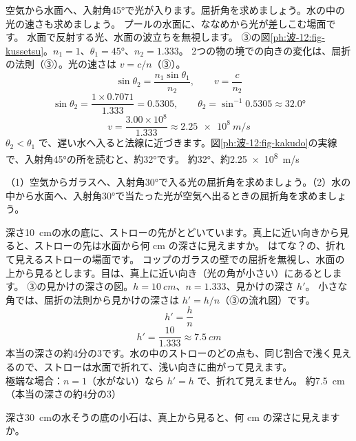 \label{ph:波-12:ex2}
\begin{phreidai}[空気から水へ入る光]
空気から水面へ、入射角\ang{45}で光が入ります。屈折角を求めましょう。水の中の光の速さも求めましょう。
\phbamen
プールの水面に、ななめから光が差しこむ場面です。
\phmushi
水面で反射する光、水面の波立ちを無視します。
\phzu
③の図\ref{ph:波-12:fig-kussetsu}。$n_1=1$、$\theta_1=\ang{45}$、$n_2=1.333$。
\phriyu
2つの物の境での向きの変化は、屈折の法則（③）。光の速さは $v=c/n$（③）。
\phtateru
\[\sin\theta_2=\frac{n_1\sin\theta_1}{n_2},\qquad v=\frac{c}{n_2}\]
\phtoku
\[\sin\theta_2=\frac{1\times0.7071}{1.333}=0.5305,\qquad\theta_2=\sin^{-1}0.5305\approx\ang{32.0}\]
\[v=\frac{3.00\times10^8}{1.333}\approx\qty{2.25e8}{m/s}\]
\phtashikame
$\theta_2<\theta_1$ で、遅い水へ入ると法線に近づきます。図\ref{ph:波-12:fig-kakudo}の実線で、入射角\ang{45}の所を読むと、約\ang{32}です。
\kotae 約\ang{32}、約\qty{2.25e8}{m/s}
\end{phreidai}
\begin{jibun}
（1）空気からガラスへ、入射角\ang{30}で入る光の屈折角を求めましょう。（2）水の中から水面へ、入射角\ang{30}で当たった光が空気へ出るときの屈折角を求めましょう。
\end{jibun}

\label{ph:波-12:ex3}
\begin{phreidai}
深さ\qty{10}{cm}の水の底に、ストローの先がとどいています。真上に近い向きから見ると、ストローの先は水面から何 cm の深さに見えますか。
\phbamen
はてな？の、折れて見えるストローの場面です。
\phmushi
コップのガラスの壁での屈折を無視し、水面の上から見るとします。目は、真上に近い向き（光の角が小さい）にあるとします。
\phzu
③の見かけの深さの図。$h=\qty{10}{cm}$、$n=1.333$、見かけの深さ $h'$。
\phriyu
小さな角では、屈折の法則から見かけの深さは $h'=h/n$（③の流れ図）です。
\phtateru
\[h'=\frac{h}{n}\]
\phtoku
\[h'=\frac{10}{1.333}\approx\qty{7.5}{cm}\]
\phtashikame
本当の深さの約4分の3です。水の中のストローのどの点も、同じ割合で浅く見えるので、ストローは水面で折れて、浅い向きに曲がって見えます。\\
極端な場合：$n=1$（水がない）なら $h'=h$ で、折れて見えません。
\kotae 約\qty{7.5}{cm}（本当の深さの約4分の3）
\end{phreidai}
\begin{jibun}
深さ\qty{30}{cm}の水そうの底の小石は、真上から見ると、何 cm の深さに見えますか。
\end{jibun}

